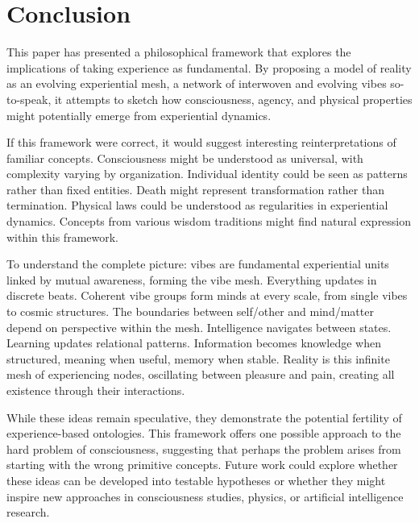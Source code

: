 \section{Conclusion}

This paper has presented a philosophical framework that explores the implications of taking experience as fundamental. By proposing a model of reality as an evolving experiential mesh, a network of interwoven and evolving vibes so-to-speak, it attempts to sketch how consciousness, agency, and physical properties might potentially emerge from experiential dynamics.

If this framework were correct, it would suggest interesting reinterpretations of familiar concepts. Consciousness might be understood as universal, with complexity varying by organization. Individual identity could be seen as patterns rather than fixed entities. Death might represent transformation rather than termination. Physical laws could be understood as regularities in experiential dynamics. Concepts from various wisdom traditions might find natural expression within this framework.

To understand the complete picture: vibes are fundamental experiential units linked by mutual awareness, forming the vibe mesh. Everything updates in discrete beats. Coherent vibe groups form minds at every scale, from single vibes to cosmic structures. The boundaries between self/other and mind/matter depend on perspective within the mesh. Intelligence navigates between states. Learning updates relational patterns. Information becomes knowledge when structured, meaning when useful, memory when stable. Reality is this infinite mesh of experiencing nodes, oscillating between pleasure and pain, creating all existence through their interactions.

While these ideas remain speculative, they demonstrate the potential fertility of experience-based ontologies. This framework offers one possible approach to the hard problem of consciousness, suggesting that perhaps the problem arises from starting with the wrong primitive concepts. Future work could explore whether these ideas can be developed into testable hypotheses or whether they might inspire new approaches in consciousness studies, physics, or artificial intelligence research.
